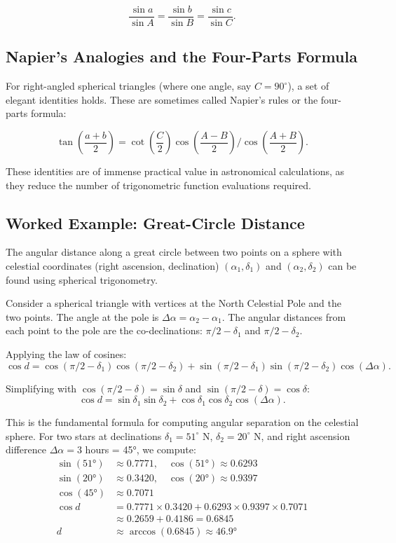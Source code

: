 \[
  \frac{\sin a}{\sin A} = \frac{\sin b}{\sin B} = \frac{\sin c}{\sin C}.
\]

\subsection*{Napier's Analogies and the Four-Parts Formula}

For right-angled spherical triangles (where one angle, say $C = 90^{\circ}$), a set of elegant identities holds. These are sometimes called Napier's rules or the four-parts formula:

\[
  \tan\left(\frac{a+b}{2}\right) = \cot\left(\frac{C}{2}\right) \cos\left(\frac{A-B}{2}\right) / \cos\left(\frac{A+B}{2}\right).
\]

These identities are of immense practical value in astronomical calculations, as they reduce the number of trigonometric function evaluations required.

\subsection*{Worked Example: Great-Circle Distance}

The angular distance along a great circle between two points on a sphere with celestial coordinates (right ascension, declination) $(\alpha_1, \delta_1)$ and $(\alpha_2, \delta_2)$ can be found using spherical trigonometry.

Consider a spherical triangle with vertices at the North Celestial Pole and the two points. The angle at the pole is $\Delta \alpha = \alpha_2 - \alpha_1$. The angular distances from each point to the pole are the co-declinations: $\pi/2 - \delta_1$ and $\pi/2 - \delta_2$.

Applying the law of cosines:
\[
  \cos d = \cos(\pi/2 - \delta_1) \cos(\pi/2 - \delta_2) + \sin(\pi/2 - \delta_1) \sin(\pi/2 - \delta_2) \cos(\Delta \alpha).
\]

Simplifying with $\cos(\pi/2 - \delta) = \sin \delta$ and $\sin(\pi/2 - \delta) = \cos \delta$:
\[
  \cos d = \sin \delta_1 \sin \delta_2 + \cos \delta_1 \cos \delta_2 \cos(\Delta \alpha).
\]

This is the fundamental formula for computing angular separation on the celestial sphere. For two stars at declinations $\delta_1 = 51^{\circ}$ N, $\delta_2 = 20^{\circ}$ N, and right ascension difference $\Delta \alpha = 3$ hours = 45°, we compute:
\begin{align*}
  \sin(51°) &\approx 0.7771, \quad \cos(51°) \approx 0.6293 \\
  \sin(20°) &\approx 0.3420, \quad \cos(20°) \approx 0.9397 \\
  \cos(45°) &\approx 0.7071 \\
  \cos d &= 0.7771 \times 0.3420 + 0.6293 \times 0.9397 \times 0.7071 \\
  &\approx 0.2659 + 0.4186 = 0.6845 \\
  d &\approx \arccos(0.6845) \approx 46.9°
\end{align*}

